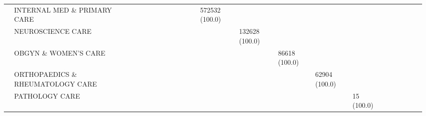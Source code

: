 \begin{tabular}{llllllllllllllllllllllll}
                                       & INTERNAL MED \& PRIMARY CARE &                             &                   &                    &                   &                      &                        &                     &                     &                     &                     &                    &              572532 (100.0) &                   &                      &                                  &                    &                    &                    &                   &                       &                     &                    \\
                                       & NEUROSCIENCE CARE &                             &                   &                    &                   &                      &                        &                     &                     &                     &                     &                    &                             &    132628 (100.0) &                      &                                  &                    &                    &                    &                   &                       &                     &                    \\
                                       & OBGYN \& WOMEN'S CARE &                             &                   &                    &                   &                      &                        &                     &                     &                     &                     &                    &                             &                   &        86618 (100.0) &                                  &                    &                    &                    &                   &                       &                     &                    \\
                                       & ORTHOPAEDICS \& RHEUMATOLOGY CARE &                             &                   &                    &                   &                      &                        &                     &                     &                     &                     &                    &                             &                   &                      &                    62904 (100.0) &                    &                    &                    &                   &                       &                     &                    \\
                                       & PATHOLOGY CARE &                             &                   &                    &                   &                      &                        &                     &                     &                     &                     &                    &                             &                   &                      &                                  &         15 (100.0) &                    &                    &                   &                       &                     &                    \\

\end{tabular}

